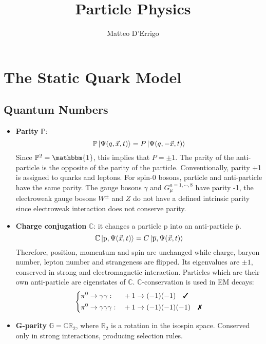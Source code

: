 \documentclass[10.75pt,a4paper,openright,bottom=2cm]{article}
\title{Particle Physics}
\author{Matteo D'Errigo}
\newcommand{\cmark}{\ding{51}}%
\newcommand{\xmark}{\ding{55}}%
\begin{document}
\maketitle
\tableofcontents
\newpage
\section{The Static Quark Model}
\subsection{Quantum Numbers}
\begin{itemize}
    \item \textbf{Parity} $\mathbb{P}$:
    \[
    \mathbb{P}\ket{\Psi(q,\Vec{x},t)}=P\ket{\Psi(q,-\Vec{x},t)}
    \]
    Since $\mathbb{P}^2=\mathbbm{1}$, this implies that $P=\pm1$. The parity of the anti-particle is the opposite of the parity of the particle. Conventionally, parity +1 is assigned to quarks and leptons. For spin-0 bosons, particle and anti-particle have the same parity. The gauge bosons $\gamma$ and $G_\mu^{a=1,\cdots,8}$ have parity -1, the electroweak gauge bosons $W^\pm$ and $Z$ do not have a defined intrinsic parity since electroweak interaction does not conserve parity.
    \item \textbf{Charge conjugation} $\mathbb{C}$: it changes a particle p into an anti-particle $\overline{\text{p}}$.
    \[
    \mathbb{C}\ket{\text{p},\Psi(\Vec{x},t)}=C\ket{\overline{\text{p}},\Psi(\Vec{x},t)}
    \]
    Therefore, position, momentum and spin are unchanged while charge, baryon number, lepton number and strangeness are flipped. Its eigenvalues are $\pm1$, conserved in strong and electromagnetic interaction. Particles which are their own anti-particle are eigenstates of $\mathbb{C}$. $\mathbb{C}$-conservation is used in EM decays:
    \[
    \left\{
    \begin{aligned}
    &\pi^0\to\gamma\gamma: &&+1\to(-1)(-1) \quad \text{\cmark}\\
    &\pi^0\to\gamma\gamma\gamma: &&+1\to(-1)(-1)(-1) \quad \text{\xmark}
    \end{aligned}
    \right.
    \]
    \item \textbf{G-parity} $\mathbb{G}=\mathbb{C}\mathbb{R}_2$, where $\mathbb{R}_2$ is a rotation in the isospin space. Conserved only in strong interactions, producing selection rules.
\end{itemize}
\end{document}
